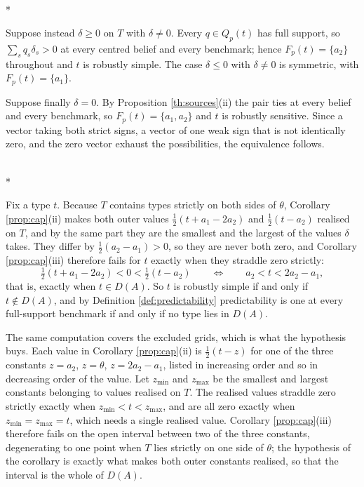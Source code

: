 \documentclass[12pt]{article}
\makeatletter
\theoremstyle{definition}
\renewenvironment{proof}[1][\proofname]{\par
  \pushQED{\qed}%
  \normalfont \topsep6\p@\@plus6\p@\relax
  \trivlist
  \item[\hskip\labelsep\itshape #1\@addpunct{.}]\mbox{}\\*
  \ignorespaces
}{%
  \popQED\endtrivlist\@endpefalse
}
\makeatother
\begin{document}
\begin{proof}[Proof of Corollary \ref{prop:cap}]
Suppose instead $\delta \ge 0$ on $T$ with $\delta \neq 0$. Every $q \in Q_p(t)$ has full support, so $\sum_s q_s \delta_s > 0$ at every centred belief and every benchmark; hence $F_p(t) = \{a_2\}$ throughout and $t$ is robustly simple. The case $\delta \le 0$ with $\delta \neq 0$ is symmetric, with $F_p(t) = \{a_1\}$.

Suppose finally $\delta = 0$. By Proposition \ref{th:sources}(ii) the pair ties at every belief and every benchmark, so $F_p(t) = \{a_1, a_2\}$ and $t$ is robustly sensitive. Since a vector taking both strict signs, a vector of one weak sign that is not identically zero, and the zero vector exhaust the possibilities, the equivalence follows.
\end{proof}

\begin{proof}[Proof of Corollary \ref{cor:deadzone}]
Fix a type $t$. Because $T$ contains types strictly on both sides of $\theta$, Corollary \ref{prop:cap}(ii) makes both outer values $\tfrac12 (t + a_1 - 2a_2)$ and $\tfrac12 (t - a_2)$ realised on $T$, and by the same part they are the smallest and the largest of the values $\delta$ takes. They differ by $\tfrac12 (a_2 - a_1) > 0$, so they are never both zero, and Corollary \ref{prop:cap}(iii) therefore fails for $t$ exactly when they straddle zero strictly:
\[
\tfrac12 (t + a_1 - 2a_2) < 0 < \tfrac12 (t - a_2)
\qquad\Longleftrightarrow\qquad
a_2 < t < 2a_2 - a_1 ,
\]
that is, exactly when $t \in D(A)$. So $t$ is robustly simple if and only if $t \notin D(A)$, and by Definition \ref{def:predictability} predictability is one at every full-support benchmark if and only if no type lies in $D(A)$.

The same computation covers the excluded grids, which is what the hypothesis buys. Each value in Corollary \ref{prop:cap}(ii) is $\tfrac12 (t - z)$ for one of the three constants $z = a_2$, $z = \theta$, $z = 2a_2 - a_1$, listed in increasing order and so in decreasing order of the value. Let $z_{\min}$ and $z_{\max}$ be the smallest and largest constants belonging to values realised on $T$. The realised values straddle zero strictly exactly when $z_{\min} < t < z_{\max}$, and are all zero exactly when $z_{\min} = z_{\max} = t$, which needs a single realised value. Corollary \ref{prop:cap}(iii) therefore fails on the open interval between two of the three constants, degenerating to one point when $T$ lies strictly on one side of $\theta$; the hypothesis of the corollary is exactly what makes both outer constants realised, so that the interval is the whole of $D(A)$.
\end{proof}
\end{document}
